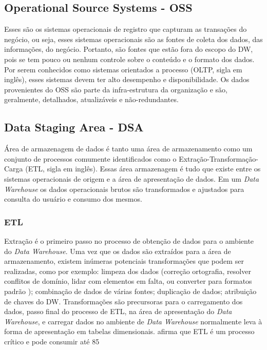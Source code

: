\subsection{Operational Source Systems - OSS}
Esses são os sistemas operacionais de registro que capturam as transações do negócio, ou seja, esses sistemas operacionais são as fontes de coleta dos dados, das informações, do negócio. Portanto, são fontes que estão fora do escopo do DW, pois se tem pouco ou nenhum controle sobre o conteúdo e o formato dos dados. Por serem conhecidos como sistemas orientados a processo (OLTP, sigla em inglês), esses sistemas devem ter alto desempenho e disponibilidade. Os dados provenientes do OSS são parte da infra-estrutura da organização e são, geralmente, detalhados, atualizáveis e não-redundantes. \cite{kimball}

\subsection{Data Staging Area - DSA}
Área de armazenagem de dados é tanto uma área de armazenamento como um conjunto de processos comumente identificados como o Extração-Transformação-Carga (ETL, sigla em inglês). Essas área armazenagem é tudo que existe entre os sistemas operacionais de origem e a área de apresentação de dados. Em um \textit{\textit{Data Warehouse}} os dados operacionais brutos são transformados e ajustados para consulta do usuário e consumo dos mesmos. \cite{kimball}

\subsubsection{ETL}
Extração é o primeiro passo no processo de obtenção de dados para o ambiente do \textit{\textit{Data Warehouse}}. Uma vez que os dados são extraídos para a área de armazenamento, existem inúmeras potenciais transformações que podem ser realizadas, como por exemplo: limpeza dos dados (correção ortografia, resolver conflitos de domínio, lidar com elementos em falta, ou converter para formatos padrão ); combinação de dados de várias fontes; duplicação de dados; atribuição de chaves do DW. Transformações são precursoras para o carregamento dos dados, passo final do processo de ETL, na área de apresentação do \textit{\textit{Data Warehouse}}, e carregar dados no ambiente de \textit{\textit{Data Warehouse}} normalmente leva à forma de apresentação em tabelas dimensionais.
\cite{kimball} afirma que ETL é um processo crítico e pode consumir até 85%

